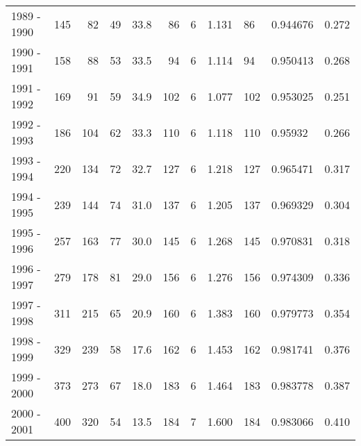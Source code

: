 \begin{tabular}{lrrrrrrrllr}
1989 - 1990 &      145 &       82 &                49 &              33.8 &                      86 &                          6 &       1.131 &            86 &   0.944676 &             0.272 \\
1990 - 1991 &      158 &       88 &                53 &              33.5 &                      94 &                          6 &       1.114 &            94 &   0.950413 &             0.268 \\
1991 - 1992 &      169 &       91 &                59 &              34.9 &                     102 &                          6 &       1.077 &           102 &   0.953025 &             0.251 \\
1992 - 1993 &      186 &      104 &                62 &              33.3 &                     110 &                          6 &       1.118 &           110 &    0.95932 &             0.266 \\
1993 - 1994 &      220 &      134 &                72 &              32.7 &                     127 &                          6 &       1.218 &           127 &   0.965471 &             0.317 \\
1994 - 1995 &      239 &      144 &                74 &              31.0 &                     137 &                          6 &       1.205 &           137 &   0.969329 &             0.304 \\
1995 - 1996 &      257 &      163 &                77 &              30.0 &                     145 &                          6 &       1.268 &           145 &   0.970831 &             0.318 \\
1996 - 1997 &      279 &      178 &                81 &              29.0 &                     156 &                          6 &       1.276 &           156 &   0.974309 &             0.336 \\
1997 - 1998 &      311 &      215 &                65 &              20.9 &                     160 &                          6 &       1.383 &           160 &   0.979773 &             0.354 \\
1998 - 1999 &      329 &      239 &                58 &              17.6 &                     162 &                          6 &       1.453 &           162 &   0.981741 &             0.376 \\
1999 - 2000 &      373 &      273 &                67 &              18.0 &                     183 &                          6 &       1.464 &           183 &   0.983778 &             0.387 \\
2000 - 2001 &      400 &      320 &                54 &              13.5 &                     184 &                          7 &       1.600 &           184 &   0.983066 &             0.410 \\

\end{tabular}
